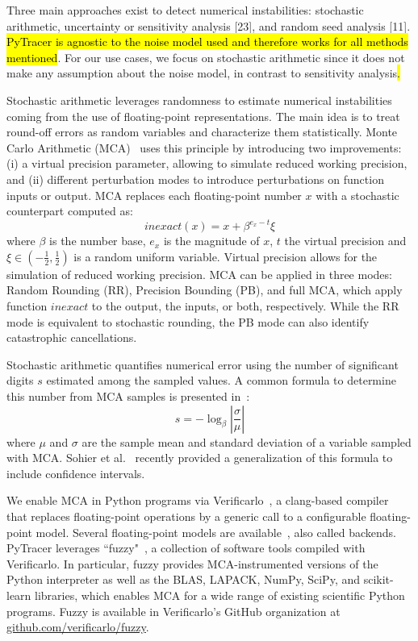 \documentclass[10pt,journal,compsoc]{IEEEtran}
\newcommand{\pytracer}[0]{PyTracer\xspace}
\DeclareRobustCommand{\add}[1]{{\sethlcolor{lightgreen}\hl{#1}}}
\begin{document}
Three  main  approaches  exist  to  detect  numerical  instabilities:
stochastic  arithmetic,  uncertainty  or  sensitivity analysis [23], and random
seed analysis [11].  \hl{PyTracer is agnostic to the noise model used and therefore
    works for all methods mentioned}.  For our use cases, we focus on stochastic
arithmetic since it does not make any assumption about the noise model, in
contrast to sensitivity analysis\add{.}

Stochastic arithmetic leverages randomness to estimate numerical instabilities
coming from the use of floating-point representations. The main idea is to treat
round-off errors as random variables and characterize them statistically. Monte
Carlo Arithmetic (MCA)~\cite{parker1997monte} uses this principle by introducing
two improvements: (i) a virtual precision parameter, allowing to simulate
reduced working precision, and (ii) different perturbation modes to introduce
perturbations on function inputs or output. MCA replaces each floating-point
number $x$ with a stochastic counterpart computed as:
\[
    inexact(x) =  x + \beta^{e_x - t}\xi
\]
where $\beta$ is the number base, $e_x$ is the magnitude of $x$, $t$ the virtual
precision and $\xi \in (-\frac{1}{2},\frac{1}{2})$ is a random uniform variable.
Virtual precision allows for the simulation of reduced working precision. MCA
can be applied in three modes: Random Rounding (RR), Precision Bounding (PB),
and full MCA, which apply function $inexact$ to the output, the inputs, or both,
respectively. While the RR mode is equivalent to stochastic rounding, the PB
mode can also identify catastrophic cancellations.

Stochastic arithmetic quantifies numerical error using the number of significant
digits $s$ estimated among the sampled values. A common formula to determine
this number from MCA samples is presented in~\cite{parker1997monte}:
\begin{equation}
    s = -\log_{\beta}{ \left| \dfrac{\sigma}{\mu} \right|} \label{eq:sig-digits}
\end{equation}
where $\mu$ and $\sigma$ are the sample mean and standard deviation of a
variable sampled with MCA.  
Sohier et al.~\cite{sohier2018confidence} recently provided a generalization of
this formula to include confidence intervals.

We enable MCA in Python programs via Verificarlo~\cite{verificarlo}, a
clang-based compiler~\cite{lattner2008llvm} that replaces floating-point
operations by a generic call to a configurable floating-point model. Several
floating-point models are
available~\cite{chatelain2019automatic,chatelain2019outils}, also called
backends. \pytracer leverages ``fuzzy"~\cite{kiar2020comparing}, a collection of
software tools compiled with Verificarlo. In particular, fuzzy provides
MCA-instrumented versions of the Python interpreter as well as the BLAS, LAPACK,
NumPy, SciPy, and scikit-learn libraries, which enables MCA for a wide range of
existing scientific Python programs. Fuzzy is available in Verificarlo's GitHub
organization at
\href{https://github.com/verificarlo/fuzzy}{\url{github.com/verificarlo/fuzzy}}.
\end{document}
